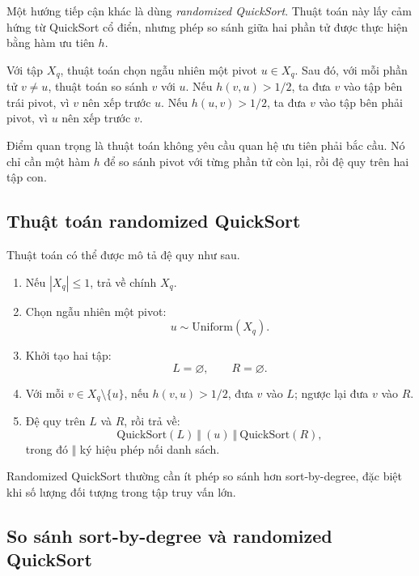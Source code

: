 Một hướng tiếp cận khác là dùng \textit{randomized QuickSort}. Thuật toán này lấy cảm hứng từ QuickSort cổ điển, nhưng phép so sánh giữa hai phần tử được thực hiện bằng hàm ưu tiên \(h\).

Với tập \(X_q\), thuật toán chọn ngẫu nhiên một pivot \(u\in X_q\). Sau đó, với mỗi phần tử \(v\neq u\), thuật toán so sánh \(v\) với \(u\). Nếu \(h(v,u)>1/2\), ta đưa \(v\) vào tập bên trái pivot, vì \(v\) nên xếp trước \(u\). Nếu \(h(u,v)>1/2\), ta đưa \(v\) vào tập bên phải pivot, vì \(u\) nên xếp trước \(v\).

Điểm quan trọng là thuật toán không yêu cầu quan hệ ưu tiên phải bắc cầu. Nó chỉ cần một hàm \(h\) để so sánh pivot với từng phần tử còn lại, rồi đệ quy trên hai tập con.

\subsection{Thuật toán randomized QuickSort}

Thuật toán có thể được mô tả đệ quy như sau.

\begin{enumerate}[label=\textbf{Bước \arabic*.}, leftmargin=*]
    \item Nếu \(|X_q|\leq 1\), trả về chính \(X_q\).

    \item Chọn ngẫu nhiên một pivot:
    \[
        u\sim \mathrm{Uniform}(X_q).
    \]

    \item Khởi tạo hai tập:
    \[
        L=\varnothing,
        \qquad
        R=\varnothing.
    \]

    \item Với mỗi \(v\in X_q\setminus\{u\}\), nếu \(h(v,u)>1/2\), đưa \(v\) vào \(L\); ngược lại đưa \(v\) vào \(R\).

    \item Đệ quy trên \(L\) và \(R\), rồi trả về:
    \[
        \mathrm{QuickSort}(L)
        \ \Vert\
        (u)
        \ \Vert\
        \mathrm{QuickSort}(R),
    \]
    trong đó \(\Vert\) ký hiệu phép nối danh sách.
\end{enumerate}

Randomized QuickSort thường cần ít phép so sánh hơn sort-by-degree, đặc biệt khi số lượng đối tượng trong tập truy vấn lớn.

\subsection{So sánh sort-by-degree và randomized QuickSort}

